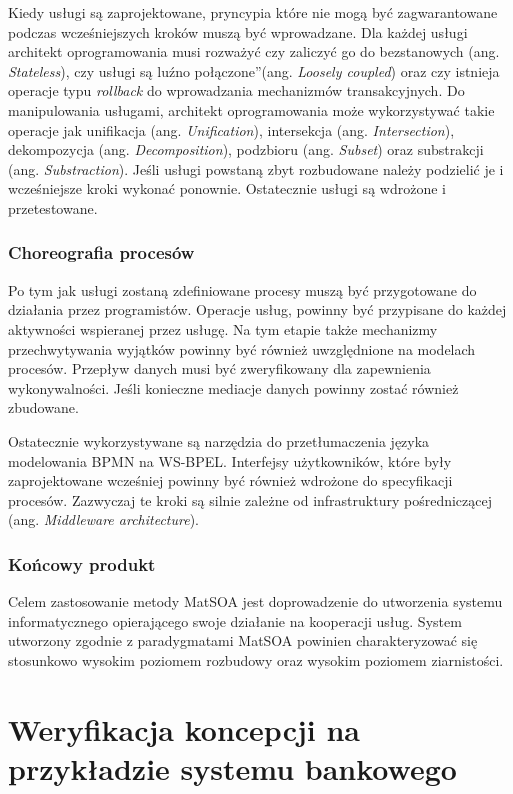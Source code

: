 Kiedy usługi są zaprojektowane, pryncypia które nie mogą być zagwarantowane podczas wcześniejszych kroków muszą być wprowadzane. Dla każdej usługi architekt oprogramowania musi rozważyć czy zaliczyć go do bezstanowych (ang. \emph{Stateless}), czy usługi są \quotedblbase luźno połączone\textquotedblright (ang. \emph{Loosely coupled}) oraz czy istnieja operacje typu \emph{rollback} do wprowadzania mechanizmów transakcyjnych. Do manipulowania usługami, architekt oprogramowania może wykorzystywać takie operacje jak  unifikacja (ang. \emph{Unification}), intersekcja (ang. \emph{Intersection}), dekompozycja (ang. \emph{Decomposition}), podzbioru (ang. \emph{Subset}) oraz substrakcji (ang. \emph{Substraction}). 
Jeśli usługi powstaną zbyt rozbudowane należy podzielić je i wcześniejsze kroki wykonać ponownie. Ostatecznie usługi są wdrożone i przetestowane. 

\subsection*{Choreografia procesów}
Po tym jak usługi zostaną zdefiniowane procesy muszą być przygotowane do działania przez programistów. Operacje usług, powinny być przypisane do każdej aktywności wspieranej przez usługę. Na tym etapie także mechanizmy przechwytywania wyjątków powinny być również uwzględnione na modelach procesów. Przepływ danych musi być zweryfikowany dla zapewnienia wykonywalności. Jeśli konieczne mediacje danych powinny zostać również zbudowane.

Ostatecznie wykorzystywane są narzędzia do przetłumaczenia języka modelowania BPMN na WS-BPEL. Interfejsy użytkowników, które były zaprojektowane wcześniej powinny być również wdrożone do specyfikacji procesów. Zazwyczaj te kroki są silnie zależne od infrastruktury pośredniczącej (ang. \emph{Middleware architecture}).

\subsection{Końcowy produkt}
Celem zastosowanie metody MatSOA jest doprowadzenie do utworzenia systemu informatycznego opierającego swoje działanie na kooperacji usług. System utworzony zgodnie z paradygmatami MatSOA powinien charakteryzować się stosunkowo wysokim poziomem rozbudowy oraz wysokim poziomem ziarnistości.

\chapter{Weryfikacja koncepcji na przykładzie systemu bankowego}
